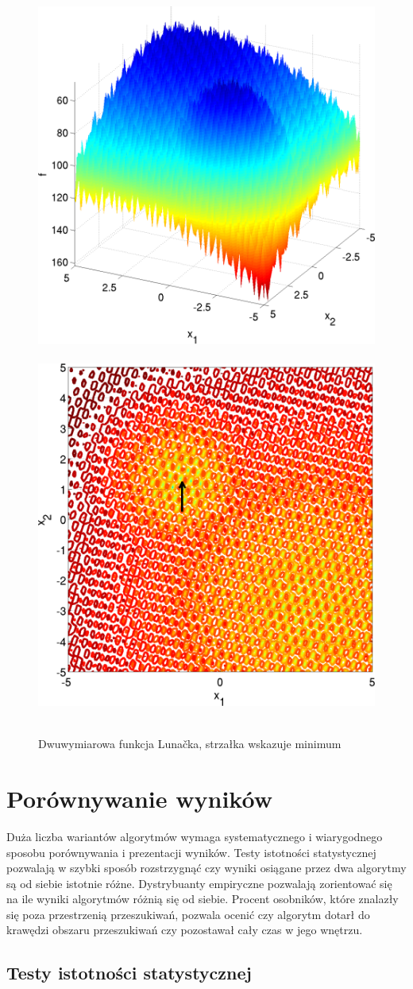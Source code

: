 \documentclass[a4paper,onecolumn,oneside,12pt,wide,floatssmall]{mwrep}
\theoremstyle{definition}
\theoremstyle{plain}%
\theoremstyle{remark}
\begin{document}
\begin{figure}[H]
\centering
\mbox{
\includegraphics[width=.45\textwidth]{img/24.png} \quad
\includegraphics[width=.45\textwidth]{img/24a.png} 
}
\caption{Dwuwymiarowa funkcja Lunačka, strzałka wskazuje minimum \cite{noiseless}}
\end{figure}

\section{Porównywanie wyników}

Duża liczba wariantów algorytmów wymaga systematycznego i wiarygodnego sposobu porównywania
i prezentacji wyników. Testy istotności statystycznej pozwalają w szybki sposób rozstrzygnąć czy 
wyniki osiągane przez dwa algorytmy są od siebie istotnie różne. Dystrybuanty empiryczne
pozwalają zorientować się na ile wyniki algorytmów różnią się od siebie. Procent osobników, które
znalazły się poza przestrzenią przeszukiwań, pozwala ocenić czy algorytm dotarł do krawędzi
obszaru przeszukiwań czy pozostawał cały czas w jego wnętrzu.

\subsection{Testy istotności statystycznej}
\label{sec:testy_istotnosci}
\end{document}
